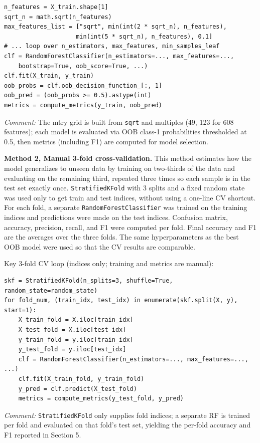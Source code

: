 \documentclass[11pt]{article}
\begin{document}
\begin{lstlisting}[style=pythonstyle]
n_features = X_train.shape[1]
sqrt_n = math.sqrt(n_features)
max_features_list = ["sqrt", min(int(2 * sqrt_n), n_features),
                    min(int(5 * sqrt_n), n_features), 0.1]
# ... loop over n_estimators, max_features, min_samples_leaf
clf = RandomForestClassifier(n_estimators=..., max_features=...,
    bootstrap=True, oob_score=True, ...)
clf.fit(X_train, y_train)
oob_probs = clf.oob_decision_function_[:, 1]
oob_pred = (oob_probs >= 0.5).astype(int)
metrics = compute_metrics(y_train, oob_pred)
\end{lstlisting}

\textit{Comment:} The mtry grid is built from \texttt{sqrt} and multiples (49, 123 for 608 features); each model is evaluated via OOB class-1 probabilities thresholded at 0.5, then metrics (including F1) are computed for model selection.

\textbf{Method 2, Manual 3-fold cross-validation.} This method estimates how the model generalizes to unseen data by training on two-thirds of the data and evaluating on the remaining third, repeated three times so each sample is in the test set exactly once. \texttt{StratifiedKFold} with 3 splits and a fixed random state was used only to get train and test indices, without using a one-line CV shortcut. For each fold, a separate \texttt{RandomForestClassifier} was trained on the training indices and predictions were made on the test indices. Confusion matrix, accuracy, precision, recall, and F1 were computed per fold. Final accuracy and F1 are the averages over the three folds. The same hyperparameters as the best OOB model were used so that the CV results are comparable.

Key 3-fold CV loop (indices only; training and metrics are manual):

\begin{lstlisting}[style=pythonstyle]
skf = StratifiedKFold(n_splits=3, shuffle=True, random_state=random_state)
for fold_num, (train_idx, test_idx) in enumerate(skf.split(X, y), start=1):
    X_train_fold = X.iloc[train_idx]
    X_test_fold = X.iloc[test_idx]
    y_train_fold = y.iloc[train_idx]
    y_test_fold = y.iloc[test_idx]
    clf = RandomForestClassifier(n_estimators=..., max_features=..., ...)
    clf.fit(X_train_fold, y_train_fold)
    y_pred = clf.predict(X_test_fold)
    metrics = compute_metrics(y_test_fold, y_pred)
\end{lstlisting}

\textit{Comment:} \texttt{StratifiedKFold} only supplies fold indices; a separate RF is trained per fold and evaluated on that fold's test set, yielding the per-fold accuracy and F1 reported in Section 5.
\end{document}
